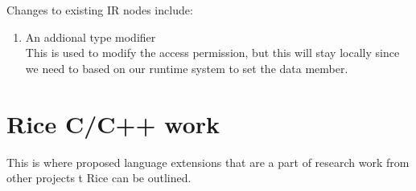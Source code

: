    Changes to existing IR nodes include:
\begin{enumerate}
     \item An addional type modifier \\
          This is used to modify the access permission, but this will stay locally since
          we need to based on our runtime system to set the data member.

\end{enumerate}



\section{Rice C/C++ work}
    This is where proposed language extensions that are a part of research work from other
    projects t Rice can be outlined.


